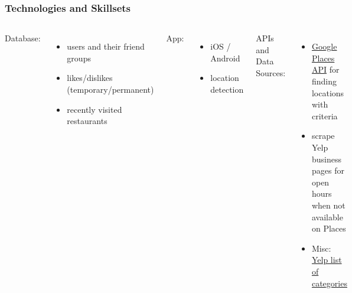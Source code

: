 \documentclass{beamer}
\begin{document}
\begin{frame}
  \frametitle{Technologies and Skillsets}
  \begin{columns}
    Database:
    \begin{itemize}
      \item users and their friend groups
      \item likes/dislikes (temporary/permanent)
      \item recently visited restaurants
    \end{itemize} \pause%

    App:
    \begin{itemize}
      \item iOS / Android
      \item location detection
    \end{itemize} \pause%

    APIs and Data Sources:
    \begin{itemize}
      \item \href{https://developers.google.com/places/web-service/search#FindPlaceRequests}{Google Places API} for finding locations with criteria
      \item scrape Yelp business pages for open hours when not available on Places
      \item Misc: \href{https://www.yelp.com/developers/documentation/v3/all_category_list}{Yelp list of categories}
    \end{itemize}
  \end{columns}
\end{frame}
\end{document}
